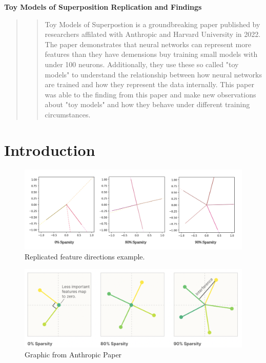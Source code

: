 \documentclass{article} %
\begin{document}


\noindent\makebox[\linewidth]{\rule{\textwidth}{1pt}} 
\vspace*{0mm} %
\begin{center}
    \Large\textbf{Toy Models of Superposition Replication and Findings}
\end{center}
\vspace*{2mm} %
\noindent\makebox[\linewidth]{\rule{\textwidth}{1pt}}
\newline

\begin{abstract}
\begin{quote}
    Toy Models of Superpostion\cite{elhage2022toy} is a groundbreaking paper published by 
    researchers affilated with Anthropic and Harvard University in 2022. The
    paper demonstrates that neural networks can represent more features than
    they have demensions buy training small models with under 100 neurons. Additionally,
    they use these so called "toy models" to understand the relationship between
    how neural networks are trained and how they represent the data internally.
    This paper was able to the finding from this paper and make new observations
    about "toy models" and how they behave under different training circumstances.
\end{quote}
\end{abstract}


\section{Introduction}


\begin{figure}[h]
    \centering
    \includegraphics[width=0.7\linewidth]{section_1/images/section1_replicated_graphic.png}
    \caption{Replicated feature directions example.}
    \label{fig:section1_replication}
\end{figure}

\begin{figure}[h]
    \centering
    \includegraphics[width=0.67\linewidth]{section_1/images/section1_anthropic_graphic_.png}
    \caption{Graphic from Anthropic Paper}
    \label{fig:section1_anthropic}
\end{figure}



\end{document}
